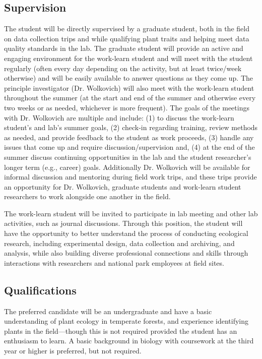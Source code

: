 \documentclass[11pt, oneside]{article}   	%
\begin{document}
\subsection {Supervision}
The student will be directly supervised by a graduate student, both in the field on data collection trips and while qualifying plant traits and helping meet data quality standards in the lab. The graduate student will provide an active and engaging environment for the work-learn student and will meet with the student regularly (often every day depending on the activity, but at least twice/week otherwise) and will be easily available to answer questions as they come up. The principle investigator (Dr. Wolkovich) will also meet with the work-learn student throughout the summer (at the start and end of the summer and otherwise every two weeks or as needed, whichever is more frequent). The goals of the meetings with Dr. Wolkovich are multiple and include: (1) to discuss the work-learn student's and lab's summer goals, (2) check-in regarding training, review methods as needed, and provide feedback to the student as work proceeds, (3) handle any issues that come up and require discussion/supervision and, (4) at the end of the summer discuss continuing opportunities in the lab and the student researcher's longer term (e.g., career) goals. Additionally Dr. Wolkovich will be available for informal discussion and mentoring during field work trips, and these trips provide an opportunity for Dr. Wolkovich, graduate students and work-learn student researchers to work alongside one another in the field. 

The work-learn student will be invited to participate in lab meeting and other lab activities, such as journal discussions. Through this position, the student will have the opportunity to better understand the process of conducting ecological research, including experimental design, data collection and archiving, and analysis, while also building diverse professional connections and skills through interactions with researchers and national park employees at field sites.  


\subsection {Qualifications}
The preferred candidate will be an undergraduate and have a basic understanding of plant ecology in temperate forests, and experience identifying plants in the field---though this is not required provided the student has an enthusiasm to learn. A basic background in biology with coursework at the third year or higher is preferred, but not required. 
\end{document}
